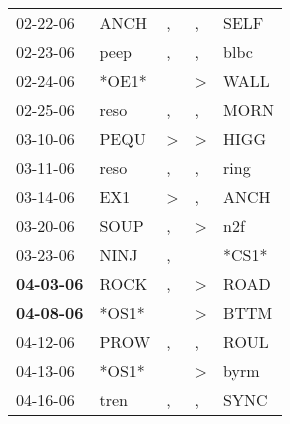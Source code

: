\begin{supertabular}{p{0.07\textwidth}p{0.06\textwidth}p{0.02\textwidth}p{0.02\textwidth}p{0.06\textwidth}}
          02-22-06\textsuperscript{} &           ANCH\textsuperscript{} &                , &                , &           SELF\textsuperscript{} \\
          02-23-06\textsuperscript{} &           peep\textsuperscript{} &                , &                , &           blbc\textsuperscript{} \\
          02-24-06\textsuperscript{} &                            *OE1* &                  &     \textgreater &           WALL\textsuperscript{} \\
          02-25-06\textsuperscript{} &           reso\textsuperscript{} &                , &                , &           MORN\textsuperscript{} \\
          03-10-06\textsuperscript{} &           PEQU\textsuperscript{} &     \textgreater &     \textgreater &           HIGG\textsuperscript{} \\
          03-11-06\textsuperscript{} &           reso\textsuperscript{} &                , &                , &           ring\textsuperscript{} \\
          03-14-06\textsuperscript{} &            EX1\textsuperscript{} &     \textgreater &                , &           ANCH\textsuperscript{} \\
          03-20-06\textsuperscript{} &           SOUP\textsuperscript{} &                , &     \textgreater &            n2f\textsuperscript{} \\
          03-23-06\textsuperscript{} &           NINJ\textsuperscript{} &                , &                  &                            *CS1* \\
 \textbf{04-03-06\textsuperscript{}} &           ROCK\textsuperscript{} &                , &     \textgreater &           ROAD\textsuperscript{} \\
 \textbf{04-08-06\textsuperscript{}} &                            *OS1* &                  &     \textgreater &           BTTM\textsuperscript{} \\
          04-12-06\textsuperscript{} &           PROW\textsuperscript{} &                , &                , &           ROUL\textsuperscript{} \\
          04-13-06\textsuperscript{} &                            *OS1* &                  &     \textgreater &           byrm\textsuperscript{} \\
          04-16-06\textsuperscript{} &           tren\textsuperscript{} &                , &                , &           SYNC\textsuperscript{} \\

\end{supertabular}
